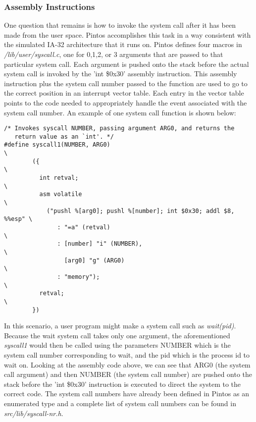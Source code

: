 \documentclass[11pt, letterpaper]{article}
\begin{document}
\subsubsection{Assembly Instructions}
One question that remains is how to invoke the system call after it has been made from the user space. Pintos accomplishes this task 
in a way consistent with the simulated IA-32 architecture that it runs on. Pintos defines four macros in \textit{/lib/user/syscall.c}, one for 0,1,2, or 3 arguments that are passed to that particular system 
call. Each argument is pushed onto the stack before the actual system call is invoked by the 'int \$0x30' assembly instruction. This 
assembly instruction plus the system call number passed to the function are used to go to the correct position in an interrupt 
vector table. Each entry in the vector table points to the code needed to appropriately handle the event associated with the system
call number. An example of one system call function is shown below:
\begin{lstlisting}[frame=single,basicstyle=\footnotesize]
/* Invokes syscall NUMBER, passing argument ARG0, and returns the
   return value as an `int'. */
#define syscall1(NUMBER, ARG0)                                           \
        ({                                                               \
          int retval;                                                    \
          asm volatile                                                   \
            ("pushl %[arg0]; pushl %[number]; int $0x30; addl $8, %%esp" \
               : "=a" (retval)                                           \
               : [number] "i" (NUMBER),                                  \
                 [arg0] "g" (ARG0)                                       \
               : "memory");                                              \
          retval;                                                        \
        })
\end{lstlisting}

In this scenario, a user program might make a system call such as \textit{wait(pid)}. Because the wait system call takes only one 
argument, the aforementioned \textit{syscall1} would then be called using the parameters NUMBER which is the system call number 
corresponding to wait, and the pid which is the process id to wait on. Looking at the assembly code above, we can see that ARG0 
(the system call argument) and then NUMBER (the system call number) are pushed onto the stack before the 'int \$0x30' instruction 
is executed to direct the system to the correct code. The system call numbers have already been defined in Pintos as an enumerated 
type and a complete list of system call numbers can be found in \textit{src/lib/syscall-nr.h}.
\end{document}
